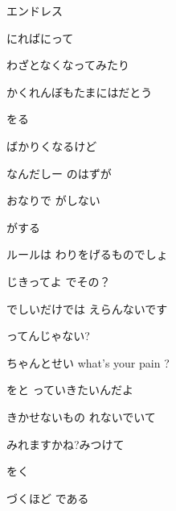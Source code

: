 \documentclass[a4paper,tate,twocolumn,12pt]{ltjtarticle}
\begin{document}
\begin{flushleft}
\noindent\begin{minipage}{\linewidth}
エンドレス

にればにって

わざとなくなってみたり

かくれんぼもたまにはだとう

をる

ばかりくなるけど
\end{minipage}

\vspace{2em}

\noindent\begin{minipage}{\linewidth}
なんだしー のはずが

おなりで がしない

 がする

ルールは わりをげるものでしょ
\end{minipage}

\vspace{2em}

\noindent\begin{minipage}{\linewidth}
じきってよ でその？

でしいだけでは えらんないです

ってんじゃない?

ちゃんとせい what's your pain ?

をと っていきたいんだよ
\end{minipage}

\vspace{2em}

\noindent\begin{minipage}{\linewidth}
きかせないもの れないでいて

みれますかね?みつけて

をく

づくほど である


\end{minipage}
\end{flushleft}
\end{document}
